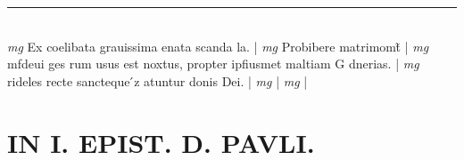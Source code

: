\documentclass{article}
\begin{document}
\begin{pages}
\vspace{0.2cm}\rule{1cm}{0.2pt}\\ 
\hspace{0.2cm}\textit{mg}
\footnotesize Ex coelibata grauissima enata scanda la. 
\normalsize| 
\hspace{0.2cm}\textit{mg}
\footnotesize Probibere matrimomt̃ 
\normalsize| 
\hspace{0.2cm}\textit{mg}
\footnotesize mfdeui ges rum usus est noxtus, propter ipfiusmet maltiam G dnerias. 
\normalsize| 
\hspace{0.2cm}\textit{mg}
\footnotesize rideles recte sancteque ́z atuntur donis Dei. 
\normalsize| 
\hspace{0.2cm}\textit{mg}
\footnotesize 
\normalsize| 
\hspace{0.2cm}\textit{mg}
\footnotesize 
\normalsize| 
\section*{IN I. EPIST. D. PAVLI. }
\marginpar{[ p.94 ]}

\end{pages}
\end{document}
